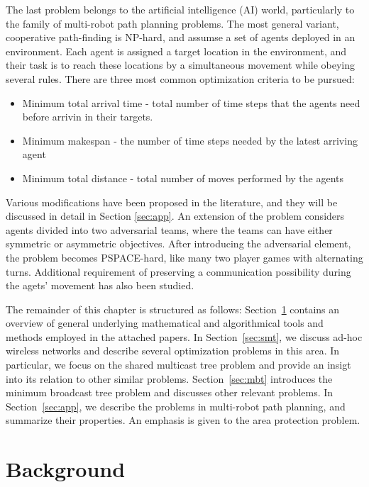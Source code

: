 The last problem belongs to the artificial intelligence (AI) world, particularly to the family of multi-robot path planning problems.
The most general variant, cooperative path-finding \cite{silver05} is NP-hard, and assumse a set of agents deployed in an environment.
Each agent is assigned a target location in the environment, and their task is to reach these locations by a simultaneous movement while obeying several rules.
There are three most common optimization criteria \cite{yu13} to be pursued:
\begin{itemize}
	\item Minimum total arrival time - total number of time steps that the agents need before arrivin in their targets.
	\item Minimum makespan - the number of time steps needed by the latest arriving agent
	\item Minimum total distance - total number of moves performed by the agents
\end{itemize}
Various modifications have been proposed in the literature, and they will be discussed in detail in Section \ref{sec:app}.
An extension of the problem considers agents divided into two adversarial teams, where the teams can have either symmetric or asymmetric objectives.
After introducing the adversarial element, the problem becomes PSPACE-hard, like many two player games with alternating turns.
Additional requirement of preserving a communication possibility during the agets' movement has also been studied.

The remainder of this chapter is structured as follows: 
Section~\ref{sec:back} contains an overview of general underlying mathematical and algorithmical tools and methods employed in the attached papers.
In Section~\ref{sec:smt}, we discuss ad-hoc wireless networks and describe several optimization problems in this area.
In particular, we focus on the shared multicast tree problem and provide an insigt into its relation to other similar problems.
Section~\ref{sec:mbt} introduces the minimum broadcast tree problem and discusses other relevant problems.
In Section~\ref{sec:app}, we describe the problems in multi-robot path planning, and summarize their properties.
An emphasis is given to the area protection problem.


\section{Background}\label{sec:back}

